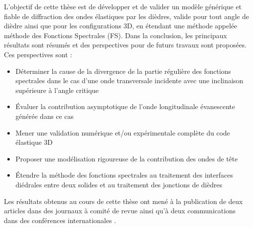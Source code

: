 L'objectif de cette thèse est de développer et de valider un modèle générique et fiable de diffraction des ondes élastiques par les dièdres, valide pour tout angle de dièdre ainsi que pour les configurations 3D, en étendant une méthode appelée méthode des Fonctions Spectrales (FS). Dans la conclusion, les principaux résultats sont résumés et des perspectives pour de futurs travaux sont proposées. Ces perspectives sont :
\begin{itemize}
\item Déterminer la cause de la divergence de la partie régulière des fonctions spectrales dans le cas d'une onde transversale incidente avec une inclinaison supérieure à l'angle critique
\item Évaluer la contribution asymptotique de l'onde longitudinale évanescente générée dans ce cas
\item Mener une validation numérique et/ou expérimentale complète du code élastique 3D
\item Proposer une modélisation rigoureuse de la contribution des ondes de tête
\item Étendre la méthode des fonctions spectrales au traitement des interfaces diédrales entre deux solides et au traitement des jonctions de dièdres
\end{itemize}


Les résultats obtenus au cours de cette thèse ont mené à la publication de deux articles dans des journaux à comité de revue \cite{article, articleelasto} ainsi qu'à deux communications dans des conférences internationales \cite{DD2018,AFPAC}.